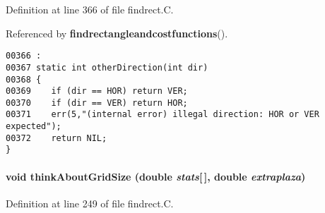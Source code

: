 Definition at line 366 of file findrect.C.

Referenced by {\bf findrectangleandcostfunctions}().\small\begin{verbatim}00366 :
00367 static int otherDirection(int dir)
00368 {
00369    if (dir == HOR) return VER;
00370    if (dir == VER) return HOR;
00371    err(5,"(internal error) illegal direction: HOR or VER expected");
00372    return NIL;
}
\end{verbatim}\normalsize 
\label{findrect.C_a22}
\paragraph{\setlength{\rightskip}{0pt plus 5cm}void think\-About\-Grid\-Size (double {\em stats}[$\,$], double {\em extraplaza})\hspace{0.3cm}{\tt  [static]}}\hfill



Definition at line 249 of file findrect.C.

